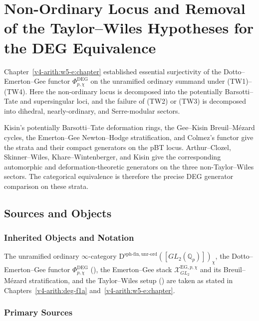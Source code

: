 \chapter{Non-Ordinary Locus and Removal of the Taylor--Wiles Hypotheses for the DEG Equivalence}
\label{v4-arith:w6-e:chapter}

Chapter~\ref{v4-arith:w5-e:chapter} established essential surjectivity
of the Dotto--Emerton--Gee functor \(\Phi^{\mathrm{DEG}}_{p,\chi}\) on
the unramified ordinary summand under (TW1)--(TW4). Here the
non-ordinary locus is decomposed into the potentially Barsotti--Tate
and supersingular loci, and the failure of (TW2) or (TW3) is decomposed
into dihedral, nearly-ordinary, and Serre-modular sectors.

Kisin's potentially Barsotti--Tate deformation rings, the
Gee--Kisin Breuil--M{\'e}zard cycles, the Emerton--Gee
Newton--Hodge stratification, and Colmez's functor give the strata and
their compact generators on the pBT locus. Arthur--Clozel,
Skinner--Wiles, Khare--Wintenberger, and Kisin give the corresponding
automorphic and deformation-theoretic generators on the three
non-Taylor--Wiles sectors. The categorical equivalence is therefore the
precise DEG generator comparison on these strata.

\section{Sources and Objects}
\label{v4-arith:w6-e:domain}

\subsection{Inherited Objects and Notation}

The unramified ordinary \(\infty\)-category
\(\mathrm{D}^{\mathrm{sph\text{-}fin,unr\text{-}ord}}([GL_{2}(\mathbb{Q}_{p})])_{\chi}\),
the Dotto--Emerton--Gee functor \(\Phi^{\mathrm{DEG}}_{p,\chi}\)
(), the Emerton--Gee stack
\(\mathcal{X}^{\mathrm{EG},p,\chi}_{GL_{2}}\) and its Breuil--M{\'e}zard
stratification, and the Taylor--Wiles setup
() are taken as stated in
Chapters~\ref{v4-arith:deg-f1a} and~\ref{v4-arith:w5-e:chapter}.

\subsection{Primary Sources}
\label{v4-arith:w6-e:sources}

